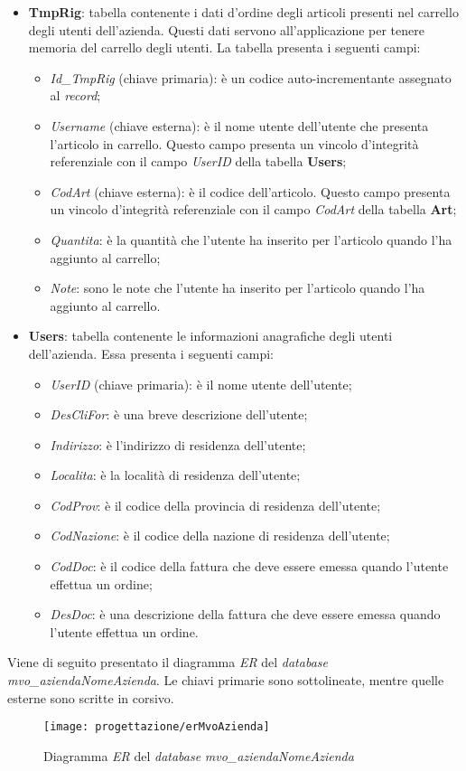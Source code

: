 \begin{itemize}
\begin{itemize}
		\end{itemize}
	\item \textbf{TmpRig}: tabella contenente i dati d'ordine degli articoli presenti nel carrello degli utenti dell'azienda. Questi dati servono all'applicazione per tenere memoria del carrello degli utenti. La tabella presenta i seguenti campi:
		\begin{itemize}
			\item \textit{Id\_TmpRig} (chiave primaria): è un codice auto-incrementante assegnato al \textit{record};
			\item \textit{Username} (chiave esterna): è il nome utente dell'utente che presenta l'articolo in carrello. Questo campo presenta un vincolo d'integrità referenziale con il campo \textit{UserID} della tabella \textbf{Users};
			\item \textit{CodArt} (chiave esterna): è il codice dell'articolo. Questo campo presenta un vincolo d'integrità referenziale con il campo \textit{CodArt} della tabella \textbf{Art};
			\item \textit{Quantita}: è la quantità che l'utente ha inserito per l'articolo quando l'ha aggiunto al carrello;
			\item \textit{Note}: sono le note che l'utente ha inserito per l'articolo quando l'ha aggiunto al carrello.
		\end{itemize}
	\item \textbf{Users}: tabella contenente le informazioni anagrafiche degli utenti dell'azienda. Essa presenta i seguenti campi:
		\begin{itemize}
			\item \textit{UserID} (chiave primaria): è il nome utente dell'utente;
			\item \textit{DesCliFor}: è una breve descrizione dell'utente;
			\item \textit{Indirizzo}: è l'indirizzo di residenza dell'utente;
			\item \textit{Localita}: è la località di residenza dell'utente;
			\item \textit{CodProv}: è il codice della provincia di residenza dell'utente;
			\item \textit{CodNazione}: è il codice della nazione di residenza dell'utente;
			\item \textit{CodDoc}: è il codice della fattura che deve essere emessa quando l'utente effettua un ordine;
			\item \textit{DesDoc}: è una descrizione della fattura che deve essere emessa quando l'utente effettua un ordine.
		\end{itemize}
\end{itemize}
Viene di seguito presentato il diagramma \textit{ER} del \textit{database} \textit{mvo\_aziendaNomeAzienda}. Le chiavi primarie sono sottolineate, mentre quelle esterne sono scritte in corsivo.

\begin{figure}[!h] 
    \centering 
    \texttt{[image: progettazione/erMvoAzienda]} 
    \caption{Diagramma \textit{ER} del \textit{database} \textit{mvo\_aziendaNomeAzienda}}
\end{figure}

